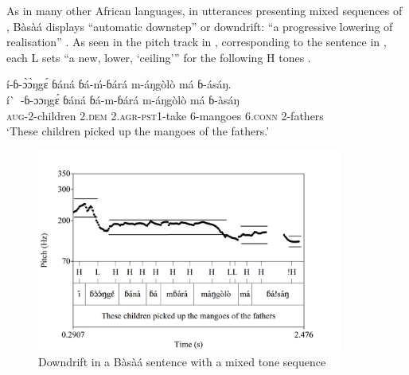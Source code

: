 \documentclass[output=paper,newtxmath,modfonts,nonflat,hidelinks]{langsci/langscibook}
\begin{document}
\begin{table}
\caption{Tonal minimal pairs in Bàsà{á} \citep{MakassoLee15}}
\label{tab:HamlaouiMakasso:1}
\end{table}

As in many other African  languages, in utterances presenting mixed sequences of , Bàsà{á} displays ``automatic downstep'' or downdrift: 
``a progressive lowering of  realisation'' \citep[2]{DowningRialland16}. As seen in the pitch track in , corresponding to the sentence in , each L  sets ``a new, lower, `ceiling'{}'' for the following H tones \citep{Connell11}.

\ea í-ɓ-\`ɔ\`ɔŋg\'ɛ ɓ{á}n{á} ɓ{á}-\'m-ɓ{á}r{á} m-{á}ŋgòlò m{á} ɓ-{á}{\↓}s{á}ŋ.\\
\gll í\`~-ɓ-ɔɔŋg\'ɛ ɓ{á}n{á} ɓ{á}-m-ɓ{á}r{á} m-{á}ŋgòlò m{á} ɓ-às{á}ŋ\\
\textsc{aug}-2-children 2.\textsc{dem} 2.\textsc{agr}-\textsc{pst1}-take 6-mangoes 6.\textsc{conn} 2-fathers\\
\glt `These children picked up the mangoes of the fathers.' \label{ex:HamlaouiMakasso:1} \\ \citep{MakassoEtAl17}
\z 

\begin{figure} 
\includegraphics[width=10cm]{figures/Downdrift}
\caption{Downdrift in a Bàsà{á} sentence with a mixed tone sequence \citep{MakassoEtAl17} \label{fig:HamlaouiMakasso:2}} 
\end{figure}
\end{document}
